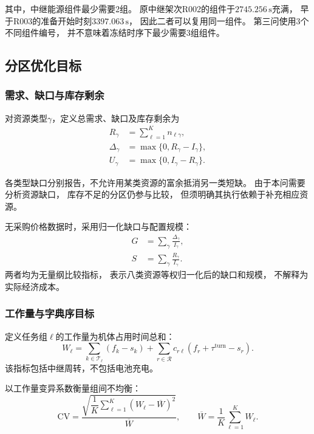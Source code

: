 \documentclass[bwprint]{gmcmthesis}
\begin{document}
其中，中继能源组件最少需要2组。
原中继架次R002的组件于$2745.256\,\mathrm{s}$充满，
早于R003的准备开始时刻$3397.063\,\mathrm{s}$，
因此二者可以复用同一组件。
第三问使用3个不同组件编号，
并不意味着冻结时序下最少需要3组组件。

\subsection{分区优化目标}

\subsubsection{需求、缺口与库存剩余}

对资源类型$\gamma$，定义总需求、缺口及库存剩余为
\begin{align}
R_\gamma&=\sum_{\ell=1}^{K}n_{\ell\gamma},\\
\Delta_\gamma&=\max\{0,R_\gamma-I_\gamma\},\\
U_\gamma&=\max\{0,I_\gamma-R_\gamma\}.
\end{align}

各类型缺口分别报告，不允许用某类资源的富余抵消另一类短缺。
由于本问需要分析资源缺口，
库存不足的分区仍参与比较，
但须明确其执行依赖于补充相应资源。

无采购价格数据时，采用归一化缺口与配置规模：
\begin{align}
G&=\sum_{\gamma}\frac{\Delta_\gamma}{I_\gamma},\\
S&=\sum_{\gamma}\frac{R_\gamma}{I_\gamma}.
\end{align}
两者均为无量纲比较指标，
表示八类资源等权归一化后的缺口和规模，
不解释为实际经济成本。

\subsubsection{工作量与字典序目标}

定义任务组$\ell$的工作量为机体占用时间总和：
\begin{equation}
W_\ell
=
\sum_{k\in\mathcal{T}_\ell}(f_k-s_k)
+
\sum_{r\in\mathcal{R}}
c_{r\ell}(f_r+\tau^{\mathrm{turn}}-s_r).
\end{equation}
该指标包括中继周转，不包括电池充电。

以工作量变异系数衡量组间不均衡：
\begin{equation}
\mathrm{CV}
=
\frac{
\sqrt{\dfrac{1}{K}\sum_{\ell=1}^{K}(W_\ell-\overline{W})^2}
}{\overline{W}},
\qquad
\overline{W}=\frac{1}{K}\sum_{\ell=1}^{K}W_\ell.
\end{equation}
\end{document}
